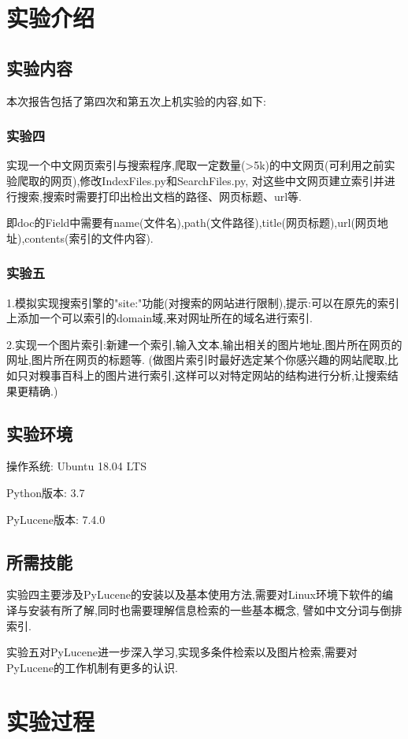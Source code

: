 \documentclass[a4paper]{article}
\begin{document}
    \tableofcontents
    \newpage
    \section{实验介绍}
        \subsection{实验内容}
        本次报告包括了第四次和第五次上机实验的内容,如下:
            \subsubsection{实验四}
实现一个中文网页索引与搜索程序,爬取一定数量(>5k)的中文网页(可利用之前实验爬取的网页),修改IndexFiles.py和SearchFiles.py,
对这些中文网页建立索引并进行搜索,搜索时需要打印出检出文档的路径、网页标题、url等.

即doc的Field中需要有name(文件名),path(文件路径),title(网页标题),url(网页地址),contents(索引的文件内容).

            \subsubsection{实验五}
1.模拟实现搜索引擎的"site:"功能(对搜索的网站进行限制),提示:可以在原先的索引上添加一个可以索引的domain域,来对网址所在的域名进行索引.

2.实现一个图片索引:新建一个索引,输入文本,输出相关的图片地址,图片所在网页的网址,图片所在网页的标题等.
(做图片索引时最好选定某个你感兴趣的网站爬取,比如只对糗事百科上的图片进行索引,这样可以对特定网站的结构进行分析,让搜索结果更精确.)
        \subsection{实验环境}
操作系统: Ubuntu 18.04 LTS

Python版本: 3.7

PyLucene版本: 7.4.0
        \subsection{所需技能}
实验四主要涉及PyLucene的安装以及基本使用方法,需要对Linux环境下软件的编译与安装有所了解,同时也需要理解信息检索的一些基本概念,
譬如中文分词与倒排索引.

实验五对PyLucene进一步深入学习,实现多条件检索以及图片检索,需要对PyLucene的工作机制有更多的认识.
    \newpage
    \section{实验过程}
\end{document}
